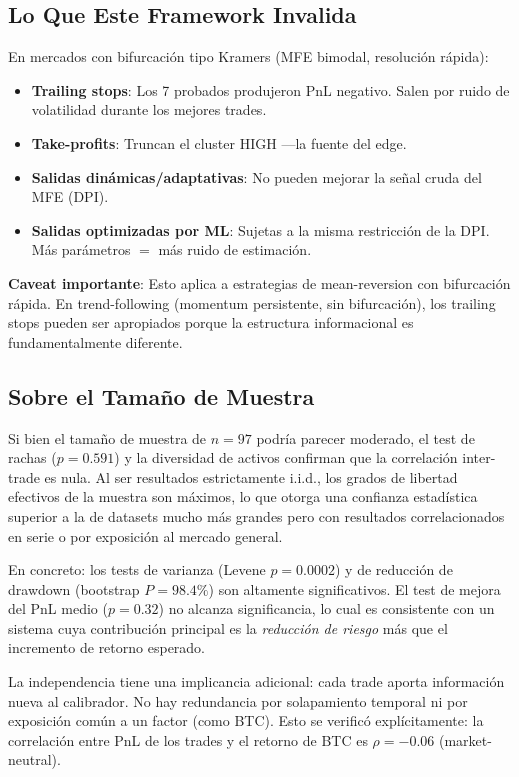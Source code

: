 \documentclass[11pt,a4paper]{article}
\begin{document}
\subsection{Lo Que Este Framework Invalida}

En mercados con bifurcación tipo Kramers (MFE bimodal, resolución rápida):
\begin{itemize}
    \item \textbf{Trailing stops}: Los 7 probados produjeron PnL negativo. Salen por ruido de volatilidad durante los mejores trades.
    \item \textbf{Take-profits}: Truncan el cluster HIGH ---la fuente del edge.
    \item \textbf{Salidas dinámicas/adaptativas}: No pueden mejorar la señal cruda del MFE (DPI).
    \item \textbf{Salidas optimizadas por ML}: Sujetas a la misma restricción de la DPI. Más parámetros $=$ más ruido de estimación.
\end{itemize}

\textbf{Caveat importante}: Esto aplica a estrategias de mean-reversion con bifurcación rápida. En trend-following (momentum persistente, sin bifurcación), los trailing stops pueden ser apropiados porque la estructura informacional es fundamentalmente diferente.

\subsection{Sobre el Tamaño de Muestra}

Si bien el tamaño de muestra de $n=97$ podría parecer moderado, el test de rachas ($p=0.591$) y la diversidad de activos confirman que la correlación inter-trade es nula. Al ser resultados estrictamente i.i.d., los grados de libertad efectivos de la muestra son máximos, lo que otorga una confianza estadística superior a la de datasets mucho más grandes pero con resultados correlacionados en serie o por exposición al mercado general.

En concreto: los tests de varianza (Levene $p = 0.0002$) y de reducción de drawdown (bootstrap $P = 98.4\%$) son altamente significativos. El test de mejora del PnL medio ($p = 0.32$) no alcanza significancia, lo cual es consistente con un sistema cuya contribución principal es la \emph{reducción de riesgo} más que el incremento de retorno esperado.

La independencia tiene una implicancia adicional: cada trade aporta información nueva al calibrador. No hay redundancia por solapamiento temporal ni por exposición común a un factor (como BTC). Esto se verificó explícitamente: la correlación entre PnL de los trades y el retorno de BTC es $\rho = -0.06$ (market-neutral).
\end{document}
